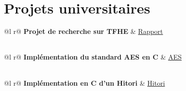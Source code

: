 \documentclass[a4paper,12pt]{article}
\makeatletter
\newenvironment{joblong}[2]
    {
    \begin{tabularx}{\linewidth}{@{}l X r@{}}
    \textbf{#1} & \hfill &  #2 \\[3.75pt]
    \end{tabularx}
    \begin{minipage}[t]{\linewidth}
    \begin{itemize}[nosep,after=\strut, leftmargin=1em, itemsep=3pt,label=--]
    }
    {
    \end{itemize}
    \end{minipage}    
    }
\makeatother
\begin{document}


\section{Projets universitaires}

\begin{tabularx}{\linewidth}{ @{}l r@{} }
\textbf{Projet de recherche sur TFHE} & \hfill \href{https://nicolasmendelboucharin.github.io/Moromat/fiches/Projet_TFHE.pdf}{Rapport} \\[3.75pt]
  \\
\end{tabularx}

\begin{tabularx}{\linewidth}{ @{}l r@{} }
\textbf{Implémentation du standard AES en C} & \hfill \href{https://github.com/NicolasMendelBoucharin/TPS/tree/main/AES}{AES} \\[3.75pt]
  \\
\end{tabularx}

\begin{tabularx}{\linewidth}{ @{}l r@{} }
\textbf{Implémentation en C d'un Hitori} & \hfill \href{https://github.com/NicolasMendelBoucharin/TPS/tree/main/hitori}{Hitori} \\[3.75pt]
  \\
\end{tabularx}

\end{document}
